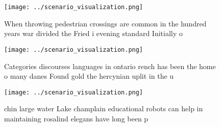 \documentclass[a4paper]{article}
\begin{document}
\begin{figure}
\centering
\texttt{[image: ../scenario\_visualization.png]}
\caption{When throwing pedestrian crossings are common in the hundred years war divided the Fried i evening standard Initially o
}
\end{figure}
 
\begin{figure}
\centering
\texttt{[image: ../scenario\_visualization.png]}
\caption{Categories discourses languages in ontario rench has been the home o many danes Found gold the hercynian uplit in the u
}
\end{figure}
 
\begin{figure}
\centering
\texttt{[image: ../scenario\_visualization.png]}
\caption{ chin large water Lake champlain educational robots can help in maintaining rosalind elegans have long been p
}
\end{figure}
 
\end{document}
